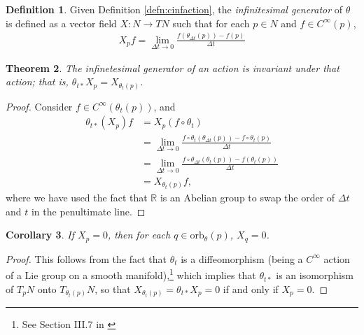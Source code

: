 \documentclass[psamsfonts]{amsart}
\newtheorem{thm}{Theorem}[section]
\newtheorem{cor}[thm]{Corollary}
\theoremstyle{definition}
\newtheorem{defn}[thm]{Definition}
\theoremstyle{remark}
\newcommand*\R{\mathds{R}}
\numberwithin{equation}{section}
\begin{document}
\begin{defn}
Given Definition \ref{defn:cinfaction}, the \textit{infinitesimal generator} of $\theta$ is defined as a vector field $X:N\rightarrow TN$ such that for each $p\in N$ and $f\in C^{\infty}(p)$, 
\begin{align}
X_pf = \lim_{\Delta t \rightarrow 0}\frac{f\left(\theta_{\Delta t}(p)\right)-f(p)}{\Delta t}
\end{align}
\end{defn}
\begin{thm}The infinetesimal generator of an action is invariant under that action; that is, $\theta_{t*}X_p = X_{\theta_{t}(p)}$.\end{thm} 
\begin{proof} Consider $f\in C^{\infty}(\theta_t(p))$, and 
\begin{equation}\begin{aligned}\label{eq:infgen_invariance}
\theta_{t*}(X_p)f &={} X_p\left(f\circ \theta_t\right)\\
&={} \lim_{\Delta t \rightarrow 0}\frac{f\circ \theta_t\left(\theta_{\Delta t}(p)\right)-f\circ \theta_t(p)}{\Delta t}\\
&={} \lim_{\Delta t \rightarrow 0}\frac{f\circ \theta_{\Delta t}\left(\theta_{t}(p)\right)-f(\theta_t(p))}{\Delta t}\\
&={} X_{\theta_t(p)}f, 
\end{aligned}\end{equation}
where we have used the fact that $\R$ is an Abelian group to swap the order of $\Delta t$ and $t$ in the penultimate line. \end{proof}

\begin{cor}\label{prop:gen_on_orbits_alts}
If $X_p=0$, then for each $q\in \text{orb}_{\theta}(p)$, $X_q=0$.
\end{cor}
\begin{proof}
 This follows from the fact that $\theta_t$ is a diffeomorphism (being a $C^{\infty}$ action of a Lie group on a smooth manifold),\footnote{See Section III.7 in \cite{boothby_2002}} which implies that $\theta_{t*}$ is an isomorphism of $T_{p}N$ onto $T_{\theta_t(p)}N$, so that $X_{\theta_t(p)}=\theta_{t*}X_p = 0$ if and only if $X_p=0$. 
 \end{proof}
\end{document}
